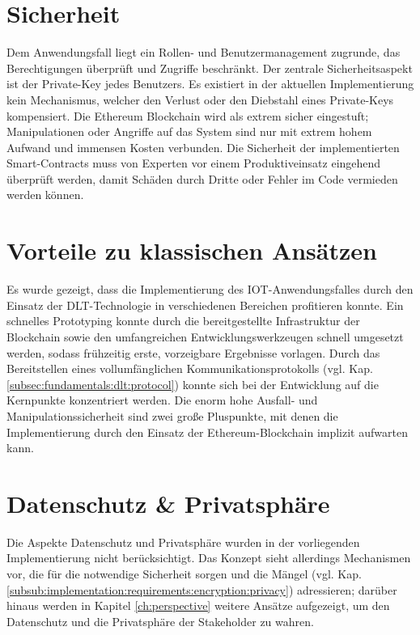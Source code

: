\section{Sicherheit}
\label{sec:results:Security}
Dem Anwendungsfall liegt ein Rollen- und Benutzermanagement zugrunde, das Berechtigungen überprüft und Zugriffe beschränkt. Der zentrale Sicherheitsaspekt ist der Private-Key jedes Benutzers. Es existiert in der aktuellen Implementierung kein Mechanismus, welcher den Verlust oder den Diebstahl eines Private-Keys kompensiert. Die Ethereum Blockchain wird als extrem sicher eingestuft; Manipulationen oder Angriffe auf das System sind nur mit extrem hohem Aufwand und immensen Kosten verbunden. Die Sicherheit der implementierten Smart-Contracts muss von Experten vor einem Produktiveinsatz eingehend überprüft werden, damit Schäden durch Dritte oder Fehler im Code vermieden werden können.

\section{Vorteile zu klassischen Ansätzen}
\label{sec:results:advantages}
Es wurde gezeigt, dass die Implementierung des \ac{IOT}-Anwendungsfalles durch den Einsatz der \ac{DLT}-Technologie in verschiedenen Bereichen profitieren konnte. Ein schnelles Prototyping konnte durch die bereitgestellte Infrastruktur der Blockchain sowie den umfangreichen Entwicklungswerkzeugen schnell umgesetzt werden, sodass frühzeitig erste, vorzeigbare Ergebnisse vorlagen. Durch das Bereitstellen eines vollumfänglichen Kommunikationsprotokolls (vgl. Kap. \ref{subsec:fundamentals:dlt:protocol}) konnte sich bei der Entwicklung auf die Kernpunkte konzentriert werden. Die enorm hohe Ausfall- und Manipulationssicherheit sind zwei große Pluspunkte, mit denen die Implementierung durch den Einsatz der Ethereum-Blockchain implizit aufwarten kann.

\section{Datenschutz \& Privatsphäre}
\label{sec:results:privacy}
Die Aspekte Datenschutz und Privatsphäre wurden in der vorliegenden Implementierung nicht berücksichtigt. Das Konzept sieht allerdings Mechanismen vor, die für die notwendige Sicherheit sorgen und die Mängel (vgl. Kap. \ref{subsub:implementation:requirements:encryption:privacy}) adressieren; darüber hinaus werden in Kapitel \ref{ch:perspective} weitere Ansätze aufgezeigt, um den Datenschutz und die Privatsphäre der Stakeholder zu wahren.

